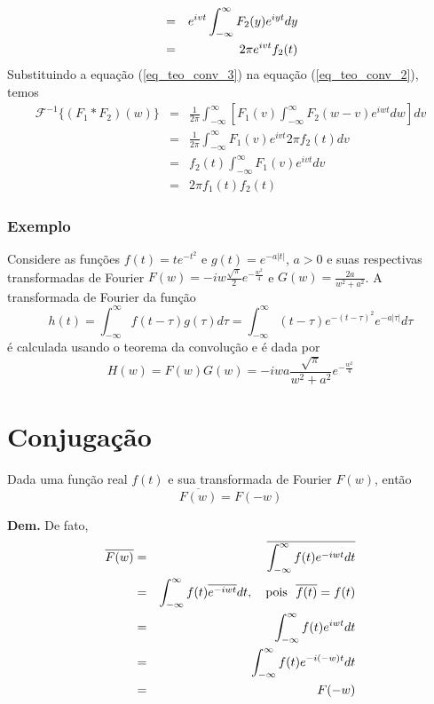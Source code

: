 \documentclass[a4paper,10pt]{book}
\begin{document}
\begin{itemize}
\begin{eqnarray}
 \nonumber &=&e^{ivt}\int_{-\infty}^\infty F_2(y)e^{iyt}dy \\
 &=&2\pi e^{ivt}f_2(t) {\label{eq_teo_conv_3}}
 \end{eqnarray}
 Substituindo a equação (\ref{eq_teo_conv_3}) na equação (\ref{eq_teo_conv_2}), temos
 \begin{eqnarray*}
 \mathcal{F}^{-1}\{(F_1*F_2)(w)\}&=&\frac{1}{2\pi}\int_{-\infty}^\infty\left[ F_1(v) \int_{-\infty}^\infty F_2(w-v)e^{iwt}dw \right]dv\\
 &=&\frac{1}{2\pi}\int_{-\infty}^\infty  F_1(v) e^{ivt} 2\pi f_2(t) dv\\
 &=&f_2(t)\int_{-\infty}^\infty F_1(v) e^{ivt} dv\\
 &=&2\pi f_1(t)f_2(t)
 \end{eqnarray*}
 \end{itemize}
\subsubsection{Exemplo}
Considere as funções $f(t)=te^{-t^2}$ e $g(t)=e^{-a|t|}$, $a>0$ e suas respectivas transformadas de Fourier $F(w)=-iw\frac{\sqrt{\pi}}{2}e^{-\frac{w^2}{4}}$ e $G(w)=\frac{2a}{w^2+a^2}$. A transformada de Fourier da função 
 \begin{equation}
 h(t)=\int_{-\infty}^\infty f(t-\tau)g(\tau)d\tau=\int_{-\infty}^\infty (t-\tau)e^{-(t-\tau)^2}e^{-a|\tau|}d\tau
 \end{equation}
 é calculada usando o teorema da convolução e é dada por
 \begin{equation}
 H(w)=F(w)G(w)=-iwa\frac{\sqrt{\pi}}{w^2+a^2}e^{-\frac{w^2}{4}}
 \end{equation}

 \section{Conjugação}
Dada uma função real $f(t)$ e sua transformada de Fourier $F(w)$, então
 \begin{equation}
 \overline{F(w)}=F(-w)
 \end{equation}

{\bf Dem.}
 De fato,
 \begin{eqnarray*}
 \overline{F(w)}&=&\overline{\int_{-\infty}^\infty f(t)e^{-iwt}dt}\\
 &=&\int_{-\infty}^\infty f(t)\overline{e^{-iwt}}dt,\quad \hbox{pois}\ \ \overline{f(t)}=f(t) \\
 &=&\int_{-\infty}^\infty f(t)e^{iwt}dt\\
 &=&\int_{-\infty}^\infty f(t)e^{-i(-w)t}dt\\
 &=&F(-w)
 \end{eqnarray*}
\end{document}
